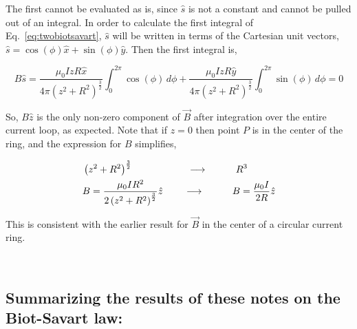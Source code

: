 \documentclass[12pt]{article}
\begin{document}
\begin{flushleft}
The first cannot be evaluated as is, since $\hat{s}$ is not a constant and cannot be pulled out of an integral.  In order to calculate the first integral of Eq.~\ref{eq:twobiotsavart}, $\hat{s}$ will be written in terms of the Cartesian unit vectors, $\hat{s}=\cos{(\phi)}\hat{x}+\sin{(\phi)}\hat{y}$.  Then the first integral is,

\begin{equation*}
B\hat{s} = \frac{ \mu_{0} IzR\hat{x}}{4\pi \left( z^{2}+R^{2} \right)^{\frac{3}{2}}} \int_{0}^{2\pi}  \cos{(\phi)}  \, d\phi + \frac{ \mu_{0} IzR\hat{y}}{4\pi \left( z^{2}+R^{2} \right)^{\frac{3}{2}}} \int_{0}^{2\pi} \sin{(\phi)} \, d\phi = 0
\end{equation*}

So, $B\hat{z}$ is the only non-zero component of $\vec{B}$ after integration over the entire current loop, as expected.  Note that if $z=0$ then point $P$ is in the center of the ring, and the expression for $B$ simplifies, 

\begin{equation*}
\begin{aligned}
& \left( z^{2}+R^{2} \right)^{\frac{3}{2}} \hspace{.8in} \longrightarrow \hspace{.4in}  R^{3} \\
& B=\frac{ \mu_{0} I R^{2}}{2\left( z^{2}+R^{2} \right)^{\frac{3}{2}}} \hat{z} \hspace{.3in} \longrightarrow \hspace{.4in}  B=\frac{ \mu_{0} I }{2R} \hat{z}
\end{aligned}
\end{equation*}

This is consistent with the earlier result for $\vec{B}$ in the center of a circular current ring.

\vspace{.1in}
{\color{mygreen} \hrulefill}\\
\vspace{.2in}

\subsection*{Summarizing the results of these notes on the Biot-Savart law:}
\vspace{.2in}


\end{flushleft}
\end{document}
